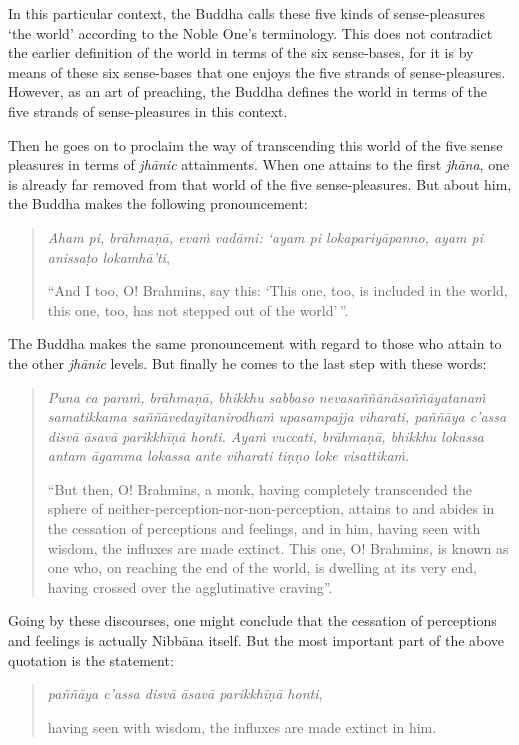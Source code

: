 In this particular context, the Buddha calls these five kinds of sense-pleasures `the world' according to the Noble One's terminology. This does not contradict the earlier definition of the world in terms of the six sense-bases, for it is by means of these six sense-bases that one enjoys the five strands of sense-pleasures. However, as an art of preaching, the Buddha defines the world in terms of the five strands of sense-pleasures in this context.

Then he goes on to proclaim the way of transcending this world of the five sense pleasures in terms of \emph{jhānic} attainments. When one attains to the first \emph{jhāna}, one is already far removed from that world of the five sense-pleasures. But about him, the Buddha makes the following pronouncement:

\begin{quote}
\emph{Aham pi, brāhmaṇā, evaṁ vadāmi: `ayam pi lokapariyāpanno, ayam pi anissaṭo lokamhā'ti},

``And I too, O! Brahmins, say this: `This one, too, is included in the world, this one, too, has not stepped out of the world'\,''.
\end{quote}

The Buddha makes the same pronouncement with regard to those who attain to the other \emph{jhānic} levels. But finally he comes to the last step with these words:

\begin{quote}
\emph{Puna ca paraṁ, brāhmaṇā, bhikkhu sabbaso nevasaññānāsaññāyatanaṁ samatikkama saññāvedayitanirodhaṁ upasampajja viharati, paññāya c'assa disvā āsavā parikkhīṇā honti. Ayaṁ vuccati, brāhmaṇā, bhikkhu lokassa antam āgamma lokassa ante viharati tiṇṇo loke visattikaṁ.}

``But then, O! Brahmins, a monk, having completely transcended the sphere of neither-perception-nor-non-perception, attains to and abides in the cessation of perceptions and feelings, and in him, having seen with wisdom, the influxes are made extinct. This one, O! Brahmins, is known as one who, on reaching the end of the world, is dwelling at its very end, having crossed over the agglutinative craving''.
\end{quote}

Going by these discourses, one might conclude that the cessation of perceptions and feelings is actually Nibbāna itself. But the most important part of the above quotation is the statement:

\begin{quote}
\emph{paññāya c'assa disvā āsavā parikkhīṇā honti},

having seen with wisdom, the influxes are made extinct in him.
\end{quote}

